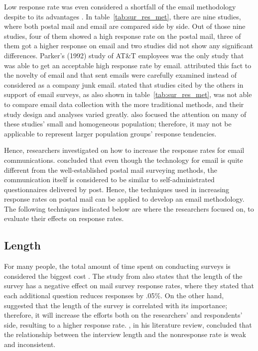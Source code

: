 Low response rate was even considered a shortfall of the email methodology despite to its advantages \citep{BachmannD.ElfrinkJ.&Vazzana1999}. In table~\ref{tab:sur_res_met}, there are nine studies, where both postal mail and email are compared side by side. Out of those nine studies, four of them showed a high response rate on the postal mail, three of them got a higher response on email and two studies did not show any significant differences. Parker's (1992) study of AT\&T employees was the only study that was able to get an acceptable high response rate by email. \cite{Schaefer1998} attributed this fact to the novelty of email and that sent emails were carefully examined instead of considered as a company junk email. \cite{Mavis1998} stated that studies cited by the others in support of email surveys, as also shown in table~\ref{tab:sur_res_met}, was not able to compare email data collection with the more traditional methods, and their study design and analyses varied greatly. \cite{Sheehan2006} also focused the attention on many of these studies' small and homogeneous population; therefore, it may not be applicable to represent larger population groups' response tendencies.
\vspace{1cm}

Hence, researchers investigated on how to increase the response rates for email communications. \cite{Schaefer1998} concluded that even though the technology for email is quite different from the well-established postal mail surveying methods, the communication itself is considered to be similar to self-administrated questionnaires delivered by post. Hence, the techniques used in increasing response rates on postal mail can be applied to develop an email methodology. The following techniques indicated below are where the researchers focused on, to evaluate their effects on response rates.

\subsection{Length}
\label{sec:2.2.1:Leng}
For many people, the total amount of time spent on conducting surveys is considered the biggest cost \citep[page 26]{DillmanDonA.SmythJoleneD.Christian2009}. The study from \cite{Heberlein1978} also states that the length of the survey has a negative effect on mail survey response rates, where they stated that each additional question reduces responses by .05\%. On the other hand, \cite{Bradburn1978} suggested that the length of the survey is correlated with its importance; therefore, it will increase the efforts both on the researchers' and respondents' side, resulting to a higher response rate. \cite{Bogen1996}, in his literature review, concluded that the relationship between the interview length and the nonresponse rate is weak and inconsistent.

